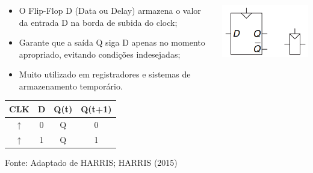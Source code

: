 \documentclass{beamer}
\begin{document}
\begin{frame}
    \frametitle{\insertsubsection}
    \scriptsize
    \begin{columns}
        \begin{column}[t]{0.5\textwidth}
            \begin{itemize}
                \item O Flip-Flop D (Data ou Delay) armazena o valor da entrada D na borda de subida do clock;
                \item Garante que a saída Q siga D apenas no momento apropriado, evitando condições indesejadas;
                \item Muito utilizado em registradores e sistemas de armazenamento temporário.
            \end{itemize}

            \vspace{0.5em}
            \centering
            \begin{tabular}{|c|c|c|c|}
                \hline
                CLK & D & Q(t) & Q(t+1) \\
                \hline
                ↑ & 0 & Q & 0 \\
                ↑ & 1 & Q & 1 \\
                \hline
            \end{tabular}
            \caption*{\tiny Fonte: Adaptado de HARRIS; HARRIS (2015)}
        \end{column}

        \begin{column}[t]{0.45\textwidth}
            \centering
            \includegraphics[width=\columnwidth]{figures/flipflop_d_symbols.png}
            
        \end{column}
    \end{columns}
\end{frame}
\end{document}
